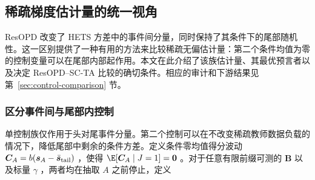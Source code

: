\subsection{稀疏梯度估计量的统一视角}
\label{sec:unified}

ResOPD 改变了 HETS 方差中的事件间分量，同时保持了其条件下的尾部随机性。这一区别提供了一种有用的方法来比较稀疏无偏估计量：第二个条件均值为零的控制变量可以在尾部内部起作用。本文在此介绍了该族估计量、其最优预言者以及决定 ResOPD--SC-TA 比较的确切条件。相应的审计和下游结果见第~\ref{sec:control-comparison} 节。

\subsubsection{区分事件间与尾部内控制}
\label{sec:joint-family}
\label{sec:event-scta}

单控制族仅作用于头对尾事件分量。第二个控制可以在不改变稀疏教师数据负载的情况下，降低尾部中剩余的条件方差。定义条件零均值得分波动
$\bm{C}_A=b(\bm{s}_A-\bar{\bm{s}}_{\mathrm{tail}})$ ，使得
$\E[\bfluct_A\mid J=1]=\bm0$ 。对于任意有限前缀可测的 $\bm B$ 以及标量 $\gamma$ ，两者均在抽取 $A$ 之前停止，定义

